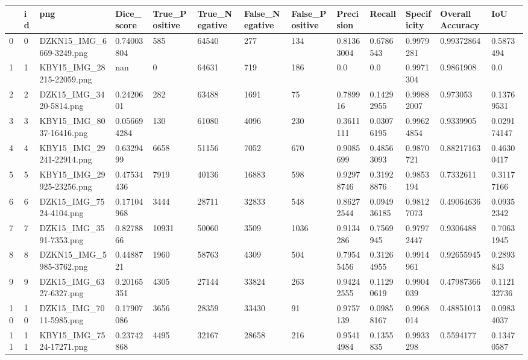 \documentclass[11pt, a4paper, twoside]{report}
\begin{document}
\begin{longtable}[c]{@{}lllllllllllll@{}}
\toprule
 & id & png & Dice\_score & True\_Positive & True\_Negative & False\_Negative & False\_Positive & Precision & Recall & Specificity & Overall Accuracy & IoU \\* \midrule
\endhead
%
\bottomrule
\endfoot
%
\endlastfoot
%
0 & 0 & DZKN15\_IMG\_6669-3249.png & 0.74003804 & 585 & 64540 & 277 & 134 & 0.81363004 & 0.6786543 & 0.9979281 & 0.99372864 & 0.5873494 \\
1 & 1 & KBY15\_IMG\_28215-22059.png & nan & 0 & 64631 & 719 & 186 & 0.0 & 0.0 & 0.9971304 & 0.9861908 & 0.0 \\
2 & 2 & DZK15\_IMG\_3420-5814.png & 0.2420601 & 282 & 63488 & 1691 & 75 & 0.789916 & 0.14292955 & 0.99882007 & 0.973053 & 0.13769531 \\
3 & 3 & KBY15\_IMG\_8037-16416.png & 0.056694284 & 130 & 61080 & 4096 & 230 & 0.3611111 & 0.03076195 & 0.99624854 & 0.9339905 & 0.029174147 \\
4 & 4 & KBY15\_IMG\_29241-22914.png & 0.6329499 & 6658 & 51156 & 7052 & 670 & 0.9085699 & 0.48563093 & 0.9870721 & 0.88217163 & 0.46300417 \\
5 & 5 & KBY15\_IMG\_29925-23256.png & 0.47534436 & 7919 & 40136 & 16883 & 598 & 0.92978746 & 0.31928876 & 0.9853194 & 0.7332611 & 0.31177166 \\
6 & 6 & DZK15\_IMG\_7524-4104.png & 0.17104968 & 3444 & 28711 & 32833 & 548 & 0.86272544 & 0.094936185 & 0.98127073 & 0.49064636 & 0.09352342 \\
7 & 7 & DZK15\_IMG\_3591-7353.png & 0.8278866 & 10931 & 50060 & 3509 & 1036 & 0.9134286 & 0.7569945 & 0.97972447 & 0.9306488 & 0.70631945 \\
8 & 8 & DZKN15\_IMG\_5985-3762.png & 0.4488721 & 1960 & 58763 & 4309 & 504 & 0.79545456 & 0.31264955 & 0.9914961 & 0.92655945 & 0.2893843 \\
9 & 9 & DZK15\_IMG\_6327-6327.png & 0.20165351 & 4305 & 27144 & 33824 & 263 & 0.94242555 & 0.11290619 & 0.9904039 & 0.47987366 & 0.112132736 \\
10 & 10 & DZK15\_IMG\_7011-5985.png & 0.17907086 & 3656 & 28359 & 33430 & 91 & 0.9757139 & 0.09858167 & 0.9968014 & 0.48851013 & 0.09834037 \\
11 & 11 & KBY15\_IMG\_7524-17271.png & 0.23742868 & 4495 & 32167 & 28658 & 216 & 0.95414984 & 0.1355835 & 0.9933298 & 0.5594177 & 0.13470587 \\

\end{longtable}
\end{document}
